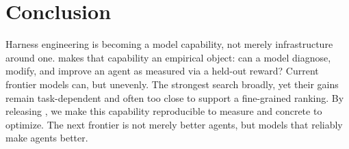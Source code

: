 \section{Conclusion}
Harness engineering is becoming a model capability, not merely infrastructure
around one. \heb makes that capability an empirical object: can a model diagnose,
modify, and improve an agent as measured via a held-out reward? Current
frontier models can, but unevenly. The strongest search broadly, yet their gains
remain task-dependent and often too close to support a fine-grained ranking.
By releasing \heb, we make this capability reproducible to measure and
concrete to optimize. The next frontier is not merely better agents, but models
that reliably make agents better.